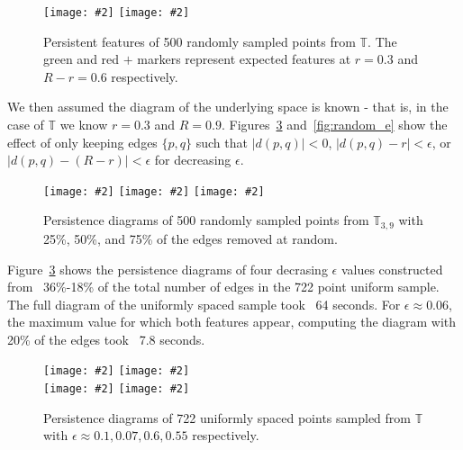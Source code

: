 \documentclass[11pt]{article}
\newcommand{\topleft}[2]{\texttt{[image: \#2]}}
\newcommand{\topright}[2]{\texttt{[image: \#2]}}
\newcommand{\bottomleft}[2]{\texttt{[image: \#2]}}
\begin{document}
\begin{figure}[ht]
        \centering
        \topleft{0.4}{figures/500random3quarter.pdf}
        \topright{0.4}{figures/500random3quarter.pdf}
        \caption{Persistent features of 500 randomly sampled points from $\mathbb{T}$. The green and red $+$ markers represent expected features at $r=0.3$ and $R-r=0.6$ respectively.}\label{fig:random}
\end{figure}

We then assumed the diagram of the underlying space is known - that is, in the case of $\mathbb{T}$ we know $r=0.3$ and $R=0.9$.
Figures~\ref{fig:uniform_e} and~\ref{fig:random_e} show the effect of only keeping edges $\{p,q\}$ such that $|d(p,q)| < 0$, $|d(p,q)-r| < \epsilon$, or $|d(p,q)-(R-r)| < \epsilon$ for decreasing $\epsilon$.

\begin{figure}[ht]
        \bottomleft{0.32}{figures/500random3quarter.pdf}
        \bottomleft{0.32}{figures/500randomhalf.pdf}
        \bottomleft{0.32}{figures/500randomquarter.pdf}
        \caption{Persistence diagrams of 500 randomly sampled points from $\mathbb{T}_{3,9}$ with 25\%, 50\%, and 75\% of the edges removed at random.}\label{fig:random_remove}
\end{figure}

Figure~\ref{fig:uniform_e} shows the persistence diagrams of four decrasing $\epsilon$ values constructed from ~36\%-18\% of the total number of edges in the 722 point uniform sample.
The full diagram of the uniformly spaced sample took ~64 seconds.
For $\epsilon\approx 0.06$, the maximum value for which both features appear, computing the diagram with 20\% of the edges took ~7.8 seconds.

\begin{figure}[ht]
        \centering
        \bottomleft{0.4}{{figures/722uniform6.0}.pdf}
        \bottomleft{0.4}{{figures/722uniform9.0}.pdf}\\
        \bottomleft{0.4}{{figures/722uniform10.0}.pdf}
        \bottomleft{0.4}{{figures/722uniform11.0}.pdf}
        \caption{Persistence diagrams of 722 uniformly spaced points sampled from $\mathbb{T}$ with $\epsilon\approx0.1,0.07,0.6,0.55$ respectively.}\label{fig:uniform_e}
\end{figure}
\end{document}
